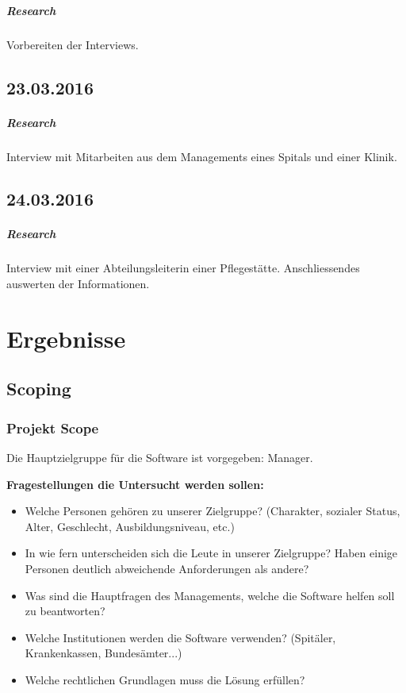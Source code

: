 \documentclass[a4paper]{scrreprt}
\begin{document}
\paragraph{Research}
Vorbereiten der Interviews.


\section*{23.03.2016}
\paragraph{Research}
Interview mit Mitarbeiten aus dem Managements eines Spitals und einer Klinik.


\section*{24.03.2016}
\paragraph{Research}
Interview mit einer Abteilungsleiterin einer Pflegestätte. Anschliessendes auswerten der Informationen.




\chapter{Ergebnisse}
\section{Scoping}

\subsection{Projekt Scope}
Die Hauptzielgruppe für die Software ist vorgegeben: Manager.

\bigskip


\textbf{Fragestellungen die Untersucht werden sollen:}
\begin{itemize}
\item Welche Personen gehören zu unserer Zielgruppe? (Charakter, sozialer Status, Alter, Geschlecht, Ausbildungsniveau, etc.)
\item In wie fern unterscheiden sich die Leute in unserer Zielgruppe? Haben einige Personen deutlich abweichende Anforderungen als andere?
\item Was sind die Hauptfragen des Managements, welche die Software helfen soll zu beantworten?
\item Welche Institutionen werden die Software verwenden? (Spitäler, Krankenkassen, Bundesämter...)
\item Welche rechtlichen Grundlagen muss die Lösung erfüllen?
\end{itemize}
\end{document}
